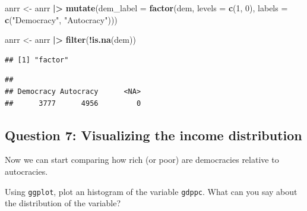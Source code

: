 \documentclass[
  11pt,
  letterpaper]{article}
\newenvironment{Shaded}{\begin{snugshade}}{\end{snugshade}}
\newcommand{\AttributeTok}[1]{\textcolor[rgb]{0.13,0.29,0.53}{#1}}
\newcommand{\DecValTok}[1]{\textcolor[rgb]{0.00,0.00,0.81}{#1}}
\newcommand{\FunctionTok}[1]{\textcolor[rgb]{0.13,0.29,0.53}{\textbf{#1}}}
\newcommand{\NormalTok}[1]{#1}
\newcommand{\OtherTok}[1]{\textcolor[rgb]{0.56,0.35,0.01}{#1}}
\newcommand{\SpecialCharTok}[1]{\textcolor[rgb]{0.81,0.36,0.00}{\textbf{#1}}}
\newcommand{\StringTok}[1]{\textcolor[rgb]{0.31,0.60,0.02}{#1}}
\begin{document}
\begin{Shaded}
\begin{Highlighting}[]
\NormalTok{anrr }\OtherTok{\textless{}{-}}\NormalTok{ anrr }\SpecialCharTok{|\textgreater{}}
  \FunctionTok{mutate}\NormalTok{(}\AttributeTok{dem\_label =} \FunctionTok{factor}\NormalTok{(dem, }
                           \AttributeTok{levels =} \FunctionTok{c}\NormalTok{(}\DecValTok{1}\NormalTok{, }\DecValTok{0}\NormalTok{),}
                           \AttributeTok{labels =} \FunctionTok{c}\NormalTok{(}\StringTok{"Democracy"}\NormalTok{, }\StringTok{"Autocracy"}\NormalTok{)))}

\NormalTok{anrr }\OtherTok{\textless{}{-}}\NormalTok{ anrr }\SpecialCharTok{|\textgreater{}}
  \FunctionTok{filter}\NormalTok{(}\SpecialCharTok{!}\FunctionTok{is.na}\NormalTok{(dem))}
\end{Highlighting}
\end{Shaded}

\begin{Shaded}
\end{Shaded}

\begin{verbatim}
## [1] "factor"
\end{verbatim}

\begin{Shaded}
\end{Shaded}

\begin{verbatim}
## 
## Democracy Autocracy      <NA> 
##      3777      4956         0
\end{verbatim}

\subsection{Question 7: Visualizing the income
distribution}\label{question-7-visualizing-the-income-distribution}

Now we can start comparing how rich (or poor) are democracies relative
to autocracies.

Using \texttt{ggplot}, plot an histogram of the variable \texttt{gdppc}.
What can you say about the distribution of the variable?
\end{document}
